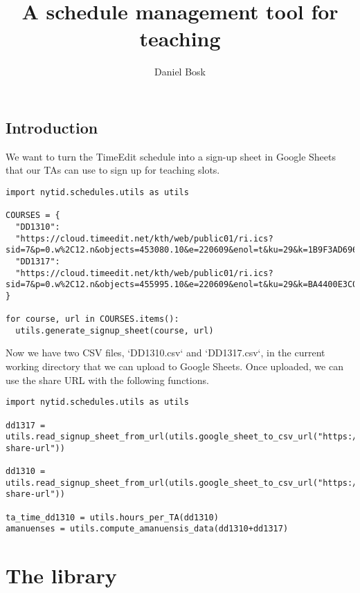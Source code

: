 \documentclass[a4paper,oneside]{book}
\title{%
  A schedule management tool for teaching
}
\author{%
  Daniel Bosk
}
\affil{%
  KTH EECS\\
  \texttt{dbosk@kth.se}
}
\newenvironment{abstract}{}{}
\begin{document}
\frontmatter
\maketitle

\vspace*{\fill}
\clearpage

\begin{abstract}
  
\end{abstract}
\clearpage

\tableofcontents
\clearpage

\mainmatter
\chapter{Introduction}

We want to turn the TimeEdit schedule into a sign-up sheet in Google Sheets 
that our TAs can use to sign up for teaching slots.
\begin{verbatim}
import nytid.schedules.utils as utils

COURSES = {
  "DD1310": 
  "https://cloud.timeedit.net/kth/web/public01/ri.ics?sid=7&p=0.w%2C12.n&objects=453080.10&e=220609&enol=t&ku=29&k=1B9F3AD696BCA5C434C68950EFD376DD",
  "DD1317": 
  "https://cloud.timeedit.net/kth/web/public01/ri.ics?sid=7&p=0.w%2C12.n&objects=455995.10&e=220609&enol=t&ku=29&k=BA4400E3C003685549BC65AD9EAD3DC58E"
}

for course, url in COURSES.items():
  utils.generate_signup_sheet(course, url)
\end{verbatim}

Now we have two CSV files, `DD1310.csv` and `DD1317.csv`, in the current 
working directory that we can upload to Google Sheets. Once uploaded, we can 
use the share URL with the following functions.
\begin{verbatim}
import nytid.schedules.utils as utils

dd1317 = utils.read_signup_sheet_from_url(utils.google_sheet_to_csv_url("https://docs.google.com/spreadsheets/d/the-share-url"))

dd1310 = utils.read_signup_sheet_from_url(utils.google_sheet_to_csv_url("https://docs.google.com/spreadsheets/d/the-share-url"))

ta_time_dd1310 = utils.hours_per_TA(dd1310)
amanuenses = utils.compute_amanuensis_data(dd1310+dd1317)
\end{verbatim}


\part{The library}





%
%



\backmatter
\printbibliography
\end{document}
